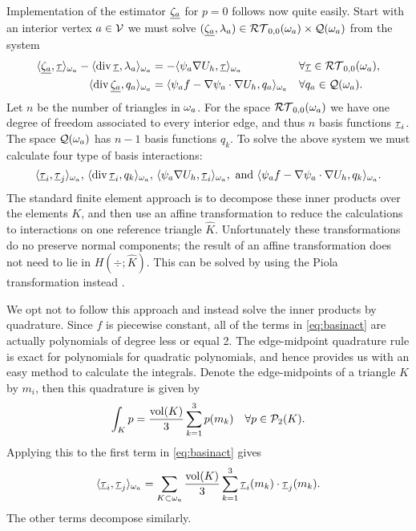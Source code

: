 \documentclass[thesis.tex]{subfiles}
\begin{document}
Implementation of the estimator $\underline{\zeta_a}$ for $p=0$ follows now quite easily. 
Start with an interior vertex $a \in \mathcal{V}$ we must solve $(\underline{\zeta_a}, \lambda_a) \in \mathcal{RT}_{0,0}(\omega_a)\times \mathcal{Q}(\omega_a)$ from the system
\begin{equation}
  \label{eq:systemp0}
  \begin{alignedat}{3}
    \langle \underline{\zeta_a}, \underline{\tau} \rangle_{\omega_a} - \langle \operatorname{div} \underline{\tau}, {\lambda_a} \rangle_{\omega_a} &= - \langle \psi_a \nabla U_h, \underline{\tau} \rangle_{\omega_a} && \quad \forall \underline{\tau} \in \mathcal{RT}_{0,0}(\omega_a),\\
    \langle \operatorname{div} \underline{\zeta_a}, q_a \rangle_{\omega_a} &= \langle \psi_a f - \nabla \psi_a \cdot \nabla U_h, q_a \rangle_{\omega_a} && \quad \forall q_a \in \mathcal{Q}(\omega_a).
  \end{alignedat}
\end{equation}
  Let $n$ be the number of triangles in $\omega_a$.
  For the space $\mathcal{RT}_{0,0}(\omega_a)$ we have one degree of freedom associated to every interior edge, and thus $n$ basis functions $\underline{\tau}_i$. The space $\mathcal{Q}(\omega_a)$ has $n-1$ basis functions $q_k$.  To solve the above system we must calculate four type of basis interactions:
  \begin{equation}
    \label{eq:basinact}
    \langle \underline{\tau}_i, \underline{\tau}_j \rangle_{\omega_a}, \, \langle \operatorname{div} \underline{\tau}_i, q_k \rangle_{\omega_a}, \, \langle \psi_a \nabla U_h, \underline{\tau}_i \rangle_{\omega_a}, \text{ and } \langle \psi_a f - \nabla \psi_a \cdot \nabla U_h, q_k \rangle_{\omega_a}.
  \end{equation}
  The standard finite element approach is to decompose these inner products over the elements $K$, and then use an affine transformation
  to reduce the calculations to interactions on one reference triangle $\hat K$. Unfortunately these transformations do no preserve
  normal components; the result of an affine transformation does not need to lie in $H(\div; \hat K)$. This can be solved 
  by using the Piola transformation instead \cite[\S2.1.3]{brezzimixed}. 
  
  We opt not to follow this approach and instead solve the inner products by quadrature. Since  $f$ is piecewise constant, all of the
  terms in \eqref{eq:basinact} are actually polynomials of degree less or equal 2. 
  The edge-midpoint quadrature rule is exact for polynomials for quadratic polynomials, and hence provides us with an easy
  method to calculate the integrals. Denote the edge-midpoints of a triangle $K$ by $m_i$, then this quadrature is given by
  \[
    \int_K p = \frac{\operatorname{vol}(K)}{3} \sum_{k=1}^3 p(m_k)\quad \forall p \in \mathcal{P}_2(K).
  \]
  Applying this to the first term in \eqref{eq:basinact} gives 
  \[
  \langle \underline{\tau}_i, \underline{\tau}_j \rangle_{\omega_a} = \sum_{K \subset \omega_a} \frac{\operatorname{vol}(K)}{3}\sum_{k=1}^3 \underline{\tau}_i(m_k) \cdot \underline{\tau}_j(m_k).
  \]
  The other terms decompose similarly.  
  
\end{document}
